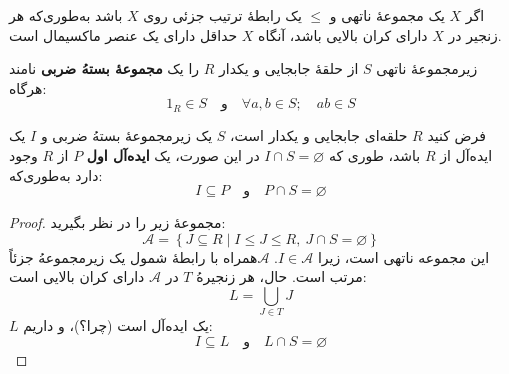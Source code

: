 \begin{frame}
    \begin{theorem}[لِم زورن]
        اگر $X$ یک مجموعهٔ ناتهی و $\leq$ یک رابطهٔ ‌ترتیب جزئی روی $X$ باشد به‌طوری‌که
        هر زنجیر در $X$ دارای کران بالایی باشد، آنگاه $X$ حداقل دارای یک عنصر ماکسیمال است.
    \end{theorem}


    \begin{definition}
        زیرمجموعهٔ ناتهی $S$ از حلقهٔ جابجایی و یکدار $R$ را یک \textbf{مجموعهٔ بستهُ ضربی} نامند هرگاه:
        \[
            1_R \in S \quad \text{و} \quad \forall a, b \in S; \quad ab \in S
        \]
    \end{definition}

\end{frame}

\begin{frame}
    \begin{theorem}
        فرض کنید $R$ حلقه‌ای جابجایی و یکدار است، $S$ یک زیرمجموعهٔ بستهُ ضربی و $I$ یک ایده‌آل از $R$ باشد، طوری که \(I \cap S = \varnothing\)
        در این صورت، یک \textbf{ایده‌آل اول} $P$ از $R$ وجود دارد به‌طوری‌که:
        \[
            I \subseteq P \quad \text{و} \quad P \cap S = \varnothing
        \]
    \end{theorem}

    \begin{proof}
        مجموعهٔ زیر را در نظر بگیرید:
        \[
            \mathcal{A} = \left\{ J \subseteq R \mid I \leqslant J \leqslant R, \ J \cap S = \varnothing \right\}
        \]
        این مجموعه ناتهی است، زیرا $I \in \mathcal{A}$.
        $\mathcal{A}$همراه با رابطهٔ شمول یک زیرمجموعهُ جزئاً مرتب است.
        حال، هر زنجیرهُ $T$ در $\mathcal{A}$ دارای کران بالایی است:
        \[
            L = \bigcup_{J \in T} J
        \]
        $L$ یک ایده‌آل است (چرا؟)، و داریم:
        \[
            I \subseteq L \quad \text{و} \quad L \cap S = \varnothing
        \]

    \end{proof}


\end{frame}


